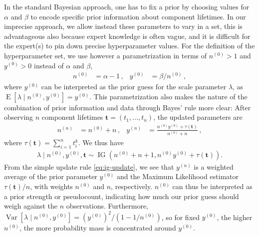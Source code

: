 \documentclass[12pt,a4paper,twocolumn,fleqn]{narms}
\renewcommand{\vec}[1]{{\bm#1}}
\newcommand{\uz}{^{(0)}} %
\newcommand{\un}{^{(n)}} %
\newcommand{\E}{\operatorname{E}}
\newcommand{\V}{\operatorname{Var}}
\newcommand{\ig}{\operatorname{IG}}   %
\def\yz{y\uz}
\def\yn{y\un}
\def\nz{n\uz}
\def\nn{n\un}
\def\taut{\tau(\vec{t})}
\begin{document}
In the standard Bayesian approach, 
one has to fix a prior by choosing values for $\alpha$ and $\beta$
to encode specific prior information about component lifetimes.
In our imprecise approach, we allow instead these parameters
to vary in a set, this is advantageous also
because expert knowledge is often vague,
and it is difficult for the expert(s) to pin down precise hyperparameter values.
For the definition of the hyperparameter set,
we use however a parametrization in terms of $\nz > 1$ and $\yz > 0$ instead of $\alpha$ and $\beta$,
\begin{align}
\nz &= \alpha - 1\,,
&
\yz &= \beta / \nz \,,
\end{align}
where $\yz$ can be interpreted as the prior guess for the scale parameter $\lambda$,
as $\E[\lambda\mid\nz,\yz] = \yz$.
This parametrization also makes the nature of the combination
of prior information and data through Bayes' rule more clear:
After observing $n$ component lifetimes $\vec{t} = (t_1, \ldots, t_n)$,
the updated parameters are
\begin{align}
\nn &= \nz + n\,, 
&
\yn &=  \frac{\nz \yz + \taut}{\nz + n}\,,
\label{eq:ig-update}
\end{align}
where $\taut = \sum_{i=1}^n t_i^k$. %
We thus have
\begin{align}
\lambda \mid \nz, \yz, \vec{t} \sim \ig(\nz + n + 1, \nz \yz + \taut). %
\label{eq:ig-update-alpha}
\end{align}
From the simple update rule \eqref{eq:ig-update}, we see that
$\yn$ is a weighted average of the prior parameter $\yz$ and the Maximum Likelihood estimator $\taut/n$,
with weights $\nz$ and $n$, respectively.
$\nz$ can thus be interpreted as a prior strength or pseudocount,
indicating how much our prior guess should weigh against the $n$ observations.
Furthermore, $\V[\lambda\mid\nz,\yz] = (\yz)^2 / (1 - 1/\nz)$,
so for fixed $\yz$, the higher $\nz$,
the more probability mass is concentrated around $\yz$. %
\end{document}
